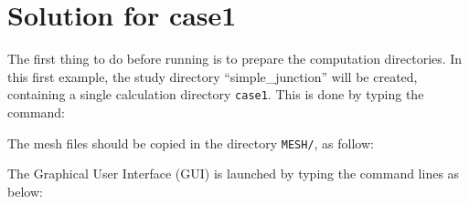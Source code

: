 
%
%
%
%


\section{Solution for case1}
The first thing to do before running \CS is to prepare the computation
directories. In this first example, the study directory ``simple\_junction'' will be
created, containing a single calculation directory \texttt{case1}.
This is done by typing the command:\\

The mesh files should be copied in the directory \texttt{MESH/}, as follow:\\

The \CS Graphical User Interface (GUI) is launched by typing the command lines as below:\\

